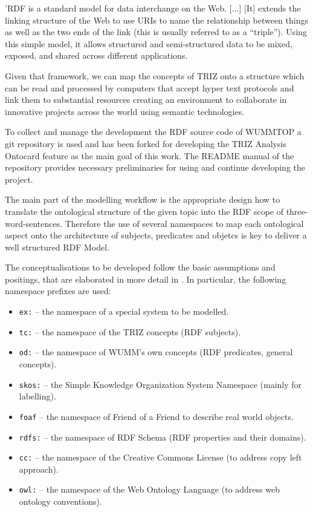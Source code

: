 \documentclass[a4paper,11pt]{article}
\begin{document}
    'RDF is a standard model for data interchange on the Web. [...] [It] 
    extends the linking structure of the Web to use URIs to name the relationship 
    between things as well as the two ends of the link 
    (this is usually referred to as a “triple”). Using this simple model, it allows 
    structured and semi-structured data to be mixed, exposed, and shared across 
    different applications. \cite{RDF}

    Given that framework, we can map the concepts of TRIZ onto a structure which can
    be read and processed by computers that accept hyper text protocols and link them
    to substantial resources creating an environment to collaborate 
    in innovative projects across the world using semantic technologies.
    
    To collect and manage the development the RDF source code of WUMMTOP a git repository
    \cite{RDFData} is used and has been forked for developing the 
    TRIZ Analysis Ontocard feature as the main goal of this work. The README manual
    of the repository provides necessary preliminaries for using and continue developing 
    the project.
 
    The main part of the modelling workflow is the appropriate design how to translate 
    the ontological structure of the given topic into the RDF scope of three-word-sentences. 
    Therefore the use of several namespaces to map each ontological aspect onto the 
    architecture of subjects, predicates and objetcs is key to deliver a well structured 
    RDF Model. 

    The conceptualisations to be developed follow the basic assumptions and
    positings, that are elaborated in more detail in \cite{Graebe2021}. In
    particular, the following namespace prefixes are used:
    \begin{itemize}[noitemsep]
    \item \texttt{ex:} -- the namespace of a special system to be modelled. 
    \item \texttt{tc:} -- the namespace of the TRIZ concepts (RDF subjects).
    \item \texttt{od:} -- the namespace of WUMM's own concepts (RDF predicates,
    general concepts).
    \item \texttt{skos:} -- the Simple Knowledge Organization System Namespace (mainly for labelling).
    \item \texttt{foaf} -- the namespace of Friend of a Friend to describe real world objects.
    \item \texttt{rdfs:} -- the namespace of RDF Schema (RDF properties and their domains).
    \item \texttt{cc:} -- the namespace of the Creative Commons License (to address copy left approach).
    \item \texttt{owl:} -- the namespace of the Web Ontology Language (to address web ontology conventions).
    \end{itemize}
\end{document}
